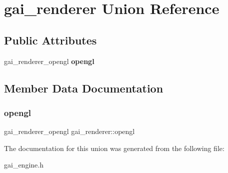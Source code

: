 \hypertarget{uniongai__renderer}{}\section{gai\+\_\+renderer Union Reference}
\label{uniongai__renderer}
\subsection*{Public Attributes}
\begin{DoxyCompactItemize}
\item 
\mbox{\label{uniongai__renderer_ab39127ce67280acdc56451722184f2f0}} 
gai\+\_\+renderer\+\_\+opengl {\bfseries opengl}
\end{DoxyCompactItemize}


\subsection{Member Data Documentation}
\mbox{\label{uniongai__renderer_ab39127ce67280acdc56451722184f2f0}} 
\subsubsection{\texorpdfstring{opengl}{opengl}}
{\footnotesize\ttfamily gai\+\_\+renderer\+\_\+opengl gai\+\_\+renderer\+::opengl}



The documentation for this union was generated from the following file\+:\begin{DoxyCompactItemize}
\item 
gai\+\_\+engine.\+h\end{DoxyCompactItemize}

